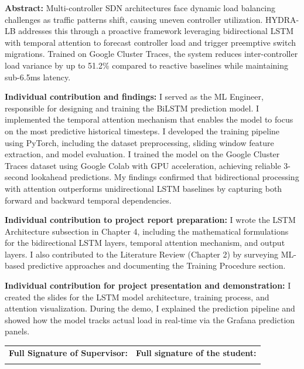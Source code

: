 \documentclass[12pt,a4paper]{report}
\begin{document}
\noindent\textbf{Abstract:} Multi-controller SDN architectures face dynamic load balancing challenges as traffic patterns shift, causing uneven controller utilization. HYDRA-LB addresses this through a proactive framework leveraging bidirectional LSTM with temporal attention to forecast controller load and trigger preemptive switch migrations. Trained on Google Cluster Traces, the system reduces inter-controller load variance by up to 51.2\% compared to reactive baselines while maintaining sub-6.5ms latency.

\vspace{0.5cm}
\noindent\textbf{Individual contribution and findings:} I served as the ML Engineer, responsible for designing and training the BiLSTM prediction model. I implemented the temporal attention mechanism that enables the model to focus on the most predictive historical timesteps. I developed the training pipeline using PyTorch, including the dataset preprocessing, sliding window feature extraction, and model evaluation. I trained the model on the Google Cluster Traces dataset using Google Colab with GPU acceleration, achieving reliable 3-second lookahead predictions. My findings confirmed that bidirectional processing with attention outperforms unidirectional LSTM baselines by capturing both forward and backward temporal dependencies.

\vspace{0.5cm}
\noindent\textbf{Individual contribution to project report preparation:} I wrote the LSTM Architecture subsection in Chapter 4, including the mathematical formulations for the bidirectional LSTM layers, temporal attention mechanism, and output layers. I also contributed to the Literature Review (Chapter 2) by surveying ML-based predictive approaches and documenting the Training Procedure section.

\vspace{0.5cm}
\noindent\textbf{Individual contribution for project presentation and demonstration:} I created the slides for the LSTM model architecture, training process, and attention visualization. During the demo, I explained the prediction pipeline and showed how the model tracks actual load in real-time via the Grafana prediction panels.

\vspace{1.5cm}
\noindent\begin{tabular}{p{7cm}p{7cm}}
\textbf{Full Signature of Supervisor:} & \textbf{Full signature of the student:} \\
\dotfill & \dotfill \\
\end{tabular}
\end{document}
